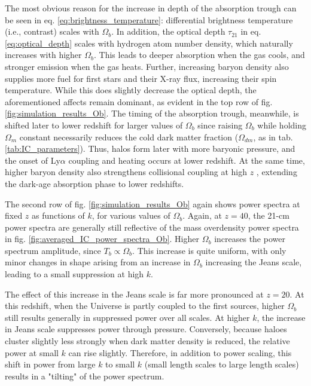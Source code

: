 \documentclass[floats,floatfix,showpacs,amssymb,prd,superscriptaddress,nofootinbib]{revtex4-2} %
\begin{document}
The most obvious reason for the increase in depth of the absorption trough can be seen in eq. \ref{eq:brightness_temperature}: differential brightness temperature (i.e., contrast) scales with $\Omega_b$. In addition, the optical depth $\tau_{21}$ in eq. \ref{eq:optical_depth} scales with hydrogen atom number density, which naturally increases with higher $\Omega_b$. This leads to deeper absorption when the gas cools, and stronger emission when the gas heats. Further, increasing baryon density also supplies more fuel for first stars and their X-ray flux, increasing their spin temperature. While this does slightly decrease the optical depth, the aforementioned affects remain dominant, as evident in the top row of fig. \ref{fig:simulation_results_Ob}. The timing of the absorption trough, meanwhile, is shifted later to lower redshift for larger values of $\Omega_b$ since raising $\Omega_b$ while holding $\Omega_m$ constant necessarily reduces the cold dark matter fraction ($\Omega_{dm}$, as in tab. \ref{tab:IC_parameters}). Thus, halos form later with more baryonic pressure, and the onset of Ly$\alpha$ coupling and heating occurs at lower redshift. At the same time, higher baryon density also strengthens collisional coupling at high $z$ , extending the dark-age absorption phase to lower redshifts. 

The second row of fig. \ref{fig:simulation_results_Ob} again shows power spectra at fixed $z$ as functions of $k$, for various values of $\Omega_b$. Again, at $z = 40$, the 21-cm power spectra are generally still reflective of the mass overdensity power spectra in fig. \ref{fig:averaged_IC_power_spectra_Ob}. Higher $\Omega_b$ increases the power spectrum amplitude, since $T_b \propto \Omega_b$.  This increase is quite uniform, with only minor changes in shape arising from an increase in $\Omega_b$ increasing the Jeans scale, leading to a small suppression at high $k$. 

The effect of this increase in the Jeans scale is far more pronounced at $z = 20$. At this redshift, when the Universe is partly coupled to the first sources, higher $\Omega_b$ still results generally in suppressed power over all scales. At higher $k$, the increase in Jeans scale suppresses power through pressure. Conversely, because haloes cluster slightly less strongly when dark matter density is reduced, the relative power at small $k$ can rise slightly. Therefore, in addition to power scaling, this shift in power from large $k$ to small $k$ (small length scales to large length scales) results in a "tilting" of the power spectrum.
\end{document}
